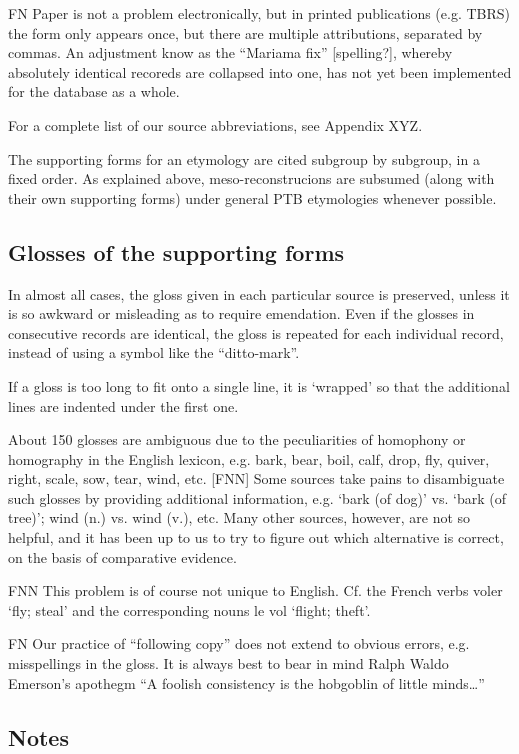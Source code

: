 FN Paper is not a problem electronically, but in printed publications (e.g. TBRS) the form only appears once, but there are  multiple attributions, separated by commas. An adjustment know as the “Mariama fix” [spelling?], whereby absolutely identical recoreds are collapsed into one, has not yet been implemented for the database as a whole.

For a complete list of our source abbreviations, see Appendix XYZ.

The supporting forms for an etymology are cited subgroup by subgroup, in a fixed order. As explained above, meso-reconstrucions are subsumed (along with their own supporting forms) under general PTB etymologies whenever possible.

\subsection{Glosses of the supporting forms}

In almost all cases, the gloss given in each particular source is preserved,
unless it is so awkward or misleading as to require emendation.  Even if the
glosses in consecutive records are identical, the gloss is repeated for each
individual record, instead of using a symbol like the “ditto-mark”.  

If a gloss is too long to fit onto a single line, it is ‘wrapped’ so that
the additional lines are indented under the first one.


About 150 glosses are ambiguous due to the peculiarities of homophony or homography in the English lexicon, e.g. bark, bear, boil, calf, drop, fly, quiver, right, scale, sow, tear, wind, etc. [FNN] Some sources take pains to disambiguate such glosses by providing additional information, e.g. ‘bark (of dog)’ vs. ‘bark (of tree)’; wind (n.) vs. wind (v.), etc. Many other sources, however, are not so helpful, and it has been up to us to try to figure out which alternative is correct, on the basis of comparative evidence.

FNN This problem is of course not unique to English. Cf. the French verbs voler ‘fly; steal’ and the corresponding nouns le vol ‘flight; theft’. 

FN Our practice of “following copy” does not extend to obvious errors, e.g. misspellings in the gloss. It is always best to bear in mind Ralph Waldo Emerson’s apothegm “A foolish consistency is the hobgoblin of little minds…”

\subsection{Notes}

